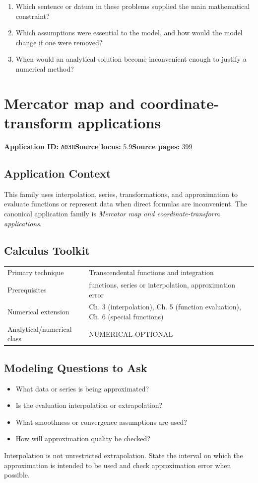 \documentclass[11pt]{book}
\newcommand{\pid}[1]{\texttt{#1}}
\begin{document}
\begin{reflectionbox}\begin{enumerate}
\item Which sentence or datum in these problems supplied the main mathematical constraint?
\item Which assumptions were essential to the model, and how would the model change if one were removed?
\item When would an analytical solution become inconvenient enough to justify a numerical method?
\end{enumerate}\end{reflectionbox}
\chapter{Mercator map and coordinate-transform applications}\label{app:A038}
\textbf{Application ID:} \pid{A038}\quad \textbf{Source locus:} 5.9\quad \textbf{Source pages:} 399
\section*{Application Context}
This family uses interpolation, series, transformations, and approximation to evaluate functions or represent data when direct formulas are inconvenient. The canonical application family is \emph{Mercator map and coordinate-transform applications}.
\section*{Calculus Toolkit}
\begin{tabularx}{\textwidth}{@{}lX@{}}\toprule
Primary technique & Transcendental functions and integration \\
Prerequisites & functions, series or interpolation, approximation error \\
Numerical extension & Ch. 3 (interpolation), Ch. 5 (function evaluation), Ch. 6 (special functions) \\
Analytical/numerical class & NUMERICAL-OPTIONAL \\
\bottomrule\end{tabularx}
\section*{Modeling Questions to Ask}\begin{itemize}
\item What data or series is being approximated?
\item Is the evaluation interpolation or extrapolation?
\item What smoothness or convergence assumptions are used?
\item How will approximation quality be checked?
\end{itemize}
\begin{errorbox}Interpolation is not unrestricted extrapolation. State the interval on which the approximation is intended to be used and check approximation error when possible.\end{errorbox}
\end{document}
